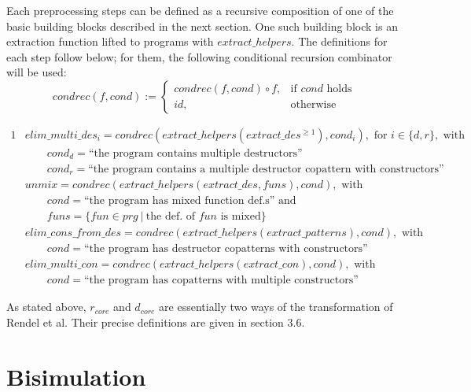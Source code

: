 Each preprocessing steps can be defined as a recursive composition of one of the basic building blocks described in the next section. One such building block is an extraction function lifted to programs with $extract\_helpers$. The definitions for each step follow below; for them, the following conditional recursion combinator will be used:
\[
    condrec(f, cond) :=
\begin{cases}
    condrec(f, cond) \circ f,& \text{if $cond$ holds} \\
   id,& \text{otherwise}
\end{cases}
\]

\begin{framed}

\begin{alignat*}{1}
&elim\_multi\_des_i = condrec(extract\_helpers(extract\_des^{\geq 1}), cond_i), \textrm{ for } i \in \{d, r\}, \textrm{ with } \\
&\qquad cond_d = \textrm{``the program contains multiple destructors''} \\
&\qquad cond_r = \textrm{``the program contains a multiple destructor copattern with constructors''} \\
&unmix = condrec(extract\_helpers(extract\_des, funs), cond), \textrm{ with}\\
&\qquad cond = \textrm{``the program has mixed function def.s'' and} \\
&\qquad funs = \{ fun \in prg ~ | ~ \textrm{the def. of $fun$ is mixed} \} \\
&elim\_cons\_from\_des = condrec(extract\_helpers(extract\_patterns), cond), \textrm{ with}\\
&\qquad cond = \textrm{``the program has destructor copatterns with constructors''} \\
&elim\_multi\_con = condrec(extract\_helpers(extract\_con), cond), \textrm{ with}\\
&\qquad cond = \textrm{``the program has copatterns with multiple constructors''}
\end{alignat*}

\end{framed}

As stated above, $r_{core}$ and $d_{core}$ are essentially two ways of the transformation of Rendel et al. Their precise definitions are given in section 3.6.

\section{Bisimulation}

